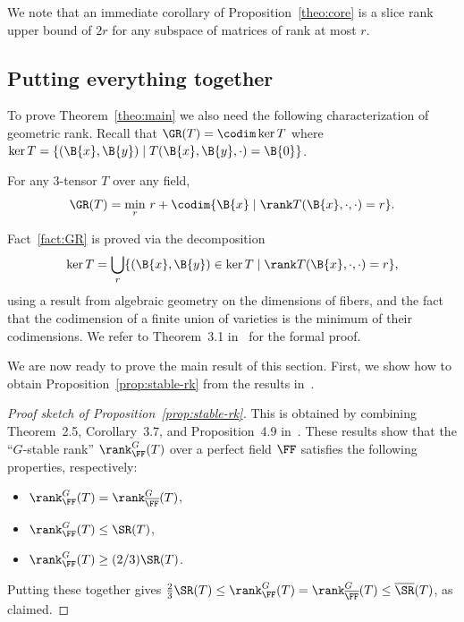 We note that an immediate corollary of Proposition~\ref{theo:core}
is a slice rank upper bound of $2r$ for any subspace of matrices of rank at most $r$.

\subsection{Putting everything together}

To prove Theorem~\ref{theo:main} we also need the following characterization of geometric rank.
Recall that $\GR(T)=\codim \ker T$ where $\ker T=\{(\B{x},\B{y}) \mid T(\B{x},\B{y},\cdot)=\B{0} \}$.
\begin{fact}\label{fact:GR}
For any $3$-tensor $T$ over any field,
$$\GR(T) = \min_r \, r + \codim\{\B{x} \mid \rank T(\B{x},\cdot,\cdot)=r\} .$$
\end{fact}
Fact~\ref{fact:GR} is proved via the decomposition
$$\ker T = \bigcup_r \{(\B{x},\B{y}) \in \ker T \mid \rank T(\B{x},\cdot,\cdot)=r\} ,$$
using a result from algebraic geometry on the dimensions of fibers, and the fact that the codimension of a finite union of varieties is the minimum of their codimensions.
We refer to Theorem~3.1 in~\cite{KoppartyMoZu20} for the formal proof.

We are now ready to prove the main result of this section.
First, we show how to obtain Proposition~\ref{prop:stable-rk} from the results in~\cite{Derksen20}.


\begin{proof}[Proof sketch of Proposition~\ref{prop:stable-rk}]
This is obtained by combining Theorem~2.5, Corollary~3.7, and Proposition~4.9 in~\cite{Derksen20}.
These results show that the ``$G$-stable rank'' $\rank^G_\FF(T)$ over a perfect field $\FF$ satisfies the following properties, respectively: 
\begin{itemize}
	\item $\rank^G_\FF(T)=\rank^G_{\overline{\FF}}(T)$,
	\item $\rank^G_\FF(T) \le \SR(T)$,
	\item $\rank^G_\FF(T) \ge (2/3)\SR(T)$.
\end{itemize}
Putting these together gives
$\frac23 \SR(T) \le \rank^G_\FF(T) = \rank^G_{\overline{\FF}}(T) \le \overline{\SR}(T)$, as claimed.
\end{proof}

